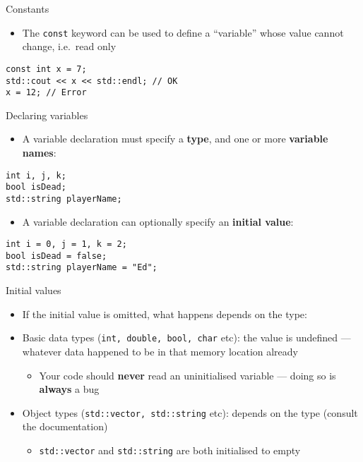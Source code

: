 \begin{frame}[fragile]{Constants}
	\begin{itemize}
		\item The \lstinline{const} keyword can be used to define a ``variable'' whose value cannot change, i.e.\ read only
	\end{itemize}
	\pause
	\begin{lstlisting}
const int x = 7;
std::cout << x << std::endl; // OK
x = 12; // Error
	\end{lstlisting}
\end{frame}

\begin{frame}[fragile]{Declaring variables}
	\begin{itemize}
		\item A variable declaration must specify a \textbf{type}, and one or more \textbf{variable names}:
	\end{itemize}
	\begin{lstlisting}
int i, j, k;
bool isDead;
std::string playerName;
	\end{lstlisting}
	\begin{itemize}
		\item A variable declaration can optionally specify an \textbf{initial value}:
	\end{itemize}
	\begin{lstlisting}
int i = 0, j = 1, k = 2;
bool isDead = false;
std::string playerName = "Ed";
	\end{lstlisting}
\end{frame}

\begin{frame}[fragile]{Initial values}
	\begin{itemize}
		\item If the initial value is omitted, what happens depends on the type: \pause
		\item Basic data types (\lstinline{int, double, bool, char} etc): the value is undefined --- whatever data happened
		to be in that memory location already \pause
		\begin{itemize}
			\item Your code should \textbf{never} read an uninitialised variable --- doing so is \textbf{always} a bug \pause
		\end{itemize}
		\item Object types (\lstinline{std::vector, std::string} etc): depends on the type (consult the documentation) \pause
		\begin{itemize}
			\item \lstinline{std::vector} and \lstinline{std::string} are both initialised to empty
		\end{itemize}
	\end{itemize}
\end{frame}

